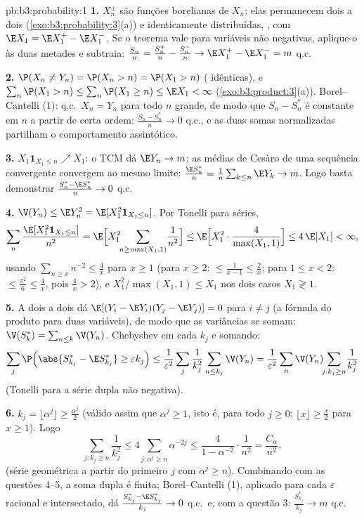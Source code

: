 \begin{solution}{pb:b3:probability:1}
\textbf{1.} $X_n^{\pm}$ são funções borelianas de $X_n$: elas
permanecem  dois a dois
(\cref{exo:b3:probability:3}(a)) e identicamente
distribuídas, , com $\E X_1 = \E X_1^+ - \E
X_1^-$. Se o teorema vale para variáveis não negativas,
aplique-o às duas metades e subtraia:
$\frac{S_n}n = \frac{S_n^+}n - \frac{S_n^-}n \to \E X_1^+ -
\E X_1^- = m$ q.c.

\textbf{2.} $\P(X_n \neq Y_n) = \P(X_n > n) = \P(X_1 > n)$
( idênticas), e $\sum_n\P(X_1 > n) \leq \sum_n\P(X_1
\geq n) \leq \E X_1 < \infty$
(\cref{exo:b3:product:3}(a)). Borel--Cantelli (1): q.c.\
$X_n = Y_n$ para todo $n$ grande, de modo que $S_n - S_n^*$ é
constante em $n$ a partir de certa ordem: $\frac{S_n - S_n^*}n \to 0$
q.c., e as duas somas normalizadas partilham o comportamento
assintótico.

\textbf{3.} $X_1\mathbf 1_{X_1 \leq n} \nearrow X_1$: o TCM
dá $\E Y_n \to m$; as médias de Cesàro de uma sequência
convergente convergem ao mesmo limite: $\frac{\E S_n^*}n =
\frac1n\sum_{k\leq n}\E Y_k \to m$. Logo basta
demonstrar $\frac{S^*_n - \E S^*_n}{n} \to 0$ q.c.

\textbf{4.} $\V(Y_n) \leq \E Y_n^2 = \E[X_1^2\mathbf
1_{X_1\leq n}]$. Por Tonelli para séries,
\[
\sum_n\frac{\E[X_1^2\mathbf 1_{X_1\leq n}]}{n^2}
= \E\Bigl[X_1^2\!\!\sum_{n \geq \max(X_1, 1)}\!\frac1{n^2}
\Bigr]
\leq \E\Bigl[X_1^2\cdot\frac{4}{\max(X_1,1)}\Bigr]
\leq 4\,\E[X_1] < \infty,
\]
usando $\sum_{n\geq x}n^{-2} \leq \frac4x$ para $x \geq 1$
(para $x \geq 2$: $\leq \frac1{x-1} \leq \frac2x$; para $1
\leq x < 2$: $\leq \frac{\pi^2}6 \leq \frac4x$, pois
$\frac4x > 2$), e $X_1^2/\max(X_1, 1) \leq X_1$ nos dois
casos $X_1 \gtrless 1$.

\textbf{5.} A  dois a dois dá $\E[(Y_i - \E
Y_i)(Y_j - \E Y_j)] = 0$ para $i \neq j$ (a fórmula
do produto para duas variáveis), de modo que as variâncias se somam: $\V(S^*_k) =
\sum_{n\leq k}\V(Y_n)$. Chebyshev em cada $k_j$ e
somando:
\[
\sum_j\P\Bigl(\abs{S^*_{k_j} - \E S^*_{k_j}} \geq
\varepsilon k_j\Bigr)
\leq \frac1{\varepsilon^2}\sum_j\frac1{k_j^2}\sum_{n\leq
k_j}\V(Y_n)
= \frac1{\varepsilon^2}\sum_n\V(Y_n)\!\!\sum_{j : k_j\geq
n}\!\frac1{k_j^2}
\]
(Tonelli para a série dupla não negativa).

\textbf{6.} $k_j = \lfloor\alpha^j\rfloor \geq
\frac{\alpha^j}2$ (válido assim que $\alpha^j \geq 1$, isto é, para todo
$j \geq 0$: $\lfloor x\rfloor \geq \frac x2$ para $x \geq
1$). Logo
\[
\sum_{j : k_j \geq n}\frac1{k_j^2}
\leq 4\sum_{j : \alpha^j \geq n}\alpha^{-2j}
\leq \frac{4}{1 - \alpha^{-2}}\cdot\frac1{n^2}
= \frac{C_\alpha}{n^2},
\]
(série geométrica a partir do primeiro $j$ com $\alpha^j \geq
n$). Combinando com as questões 4--5, a soma dupla é
finita; Borel--Cantelli (1), aplicado para cada
$\varepsilon$ racional e intersectado, dá
$\frac{S^*_{k_j} - \E S^*_{k_j}}{k_j} \to 0$ q.c.\ e, com
a questão 3: $\frac{S^*_{k_j}}{k_j} \to m$ q.c.


\end{solution}
